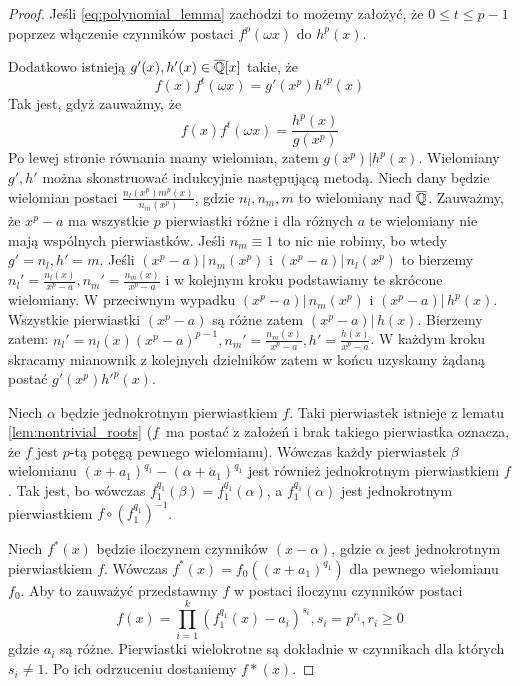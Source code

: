 \begin{proof}
  Jeśli \ref{eq:polynomial_lemma} zachodzi to możemy założyć, że $0 \leq t \leq
  p - 1$ poprzez włączenie czynników postaci $f^p(\omega x)$ do $h^p(x)$.

  Dodatkowo istnieją $g'(x), h'(x) \in \overline{\mathbb{Q}}[x]$ takie, że
  \begin{equation}
    f(x) f^t(\omega x) = g' \left( x^p \right) h'^p(x)
    \label{eq:polynomial_lemma_right}
  \end{equation}
  Tak jest, gdyż zauważmy, że
  \[ f(x) f^t(\omega x) = \frac{h^p(x)}{g \left( x^p \right)} \]
  Po lewej stronie równania mamy wielomian, zatem $g \left( x^p \right) |
  h^p(x)$. Wielomiany $g', h'$ można skonstruować indukcyjnie następującą
  metodą. Niech dany będzie wielomian postaci
  $\frac{n_l \left( x^p \right) m^p(x)}{n_m \left( x^p \right)}$, gdzie $n_l,
  n_m, m$ to wielomiany nad $\overline{\mathbb{Q}}$. Zauważmy, że $x^p - a$ ma wszystkie
  $p$ pierwiastki różne i dla różnych $a$ te wielomiany nie mają wspólnych
  pierwiastków. Jeśli $n_m \equiv 1$ to nic nie robimy, bo wtedy $g' = n_l, h' =
  m$.
  Jeśli $\left(x^p - a \right) | \, n_m \left(x^p\right)$ i $\left(x^p - a
  \right) | \, n_l \left(x^p\right)$ to bierzemy
  $n_l' = \frac{n_l(x)}{x^p - a}, n_m' = \frac{n_m(x)}{x^p - a}$ i w kolejnym
  kroku podstawiamy te skrócone wielomiany.
  W przeciwnym wypadku
  $\left(x^p - a \right) | \, n_m \left(x^p \right)$ i
  $\left(x^p - a \right) | \, h^p \left(x \right)$. Wszystkie pierwiastki
  $\left(x^p - a \right)$ są różne zatem $\left(x^p - a \right) | \, h(x)$.
  Bierzemy zatem:
  $n_l' = n_l(x)\left(x^p - a \right)^{p-1}, n_m' = \frac{n_m(x)}{x^p -
  a}, h' = \frac{h(x)}{x^p - a}$.
  W każdym kroku skracamy mianownik z kolejnych dzielników zatem w końcu
  uzyskamy żądaną postać $g'\left(x^p \right) h'^p(x)$.

  Niech $\alpha$ będzie jednokrotnym pierwiastkiem $f$. Taki pierwiastek
  istnieje z lematu \ref{lem:nontrivial_roots} ($f$~ma postać z założeń i brak
  takiego pierwiastka oznacza, że $f$ jest $p$-tą potęgą pewnego wielomianu).
  Wówczas każdy pierwiastek $\beta$ wielomianu $\left(x + a_1\right)^{q_1} -
  \left(\alpha + a_1\right)^{q_1}$ jest również jednokrotnym pierwiastkiem $f$.
  Tak jest, bo wówczas $f_1^{q_1}(\beta) = f_1^{q_1}(\alpha)$, a $f_1^{q_1}(\alpha)$ jest
  jednokrotnym pierwiastkiem $f \circ \left(f_1^{q_1}\right)^{-1}$.

  Niech $f^*(x)$ będzie iloczynem czynników $(x-\alpha)$, gdzie $\alpha$ jest
  jednokrotnym pierwiastkiem $f$. Wówczas $f^*(x) = f_0 \left( \left(x + a_1
  \right)^{q_1} \right)$ dla pewnego wielomianu $f_0$. Aby to zauważyć
  przedstawmy $f$ w postaci iloczynu czynników postaci
  \[ f(x) = \prod_{i=1}^k \left(f_1^{q_1}(x) - a_i\right)^{s_i},
  s_i = p^{r_i}, r_i \geq 0\]
  gdzie $a_i$ są różne. Pierwiastki wielokrotne są dokładnie w czynnikach dla
  których $s_i \neq 1$. Po ich odrzuceniu dostaniemy $f*(x)$.



\end{proof}
